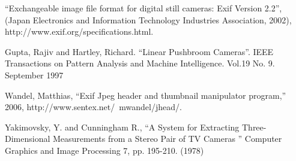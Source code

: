 \begin{thebibliography}{1}

 ``Exchangeable image file format for digital still cameras: Exif Version 2.2'',
(Japan Electronics and Information Technology Industries Association, 2002),
http://www.exif.org/specifications.html.

 Gupta, Rajiv and Hartley, Richard. ``Linear Pushbroom Cameras''.  IEEE
 Transactions on Pattern Analysis and Machine Intelligence. Vol.19 No. 9. September 1997

 Wandel, Matthias, ``Exif Jpeg header and thumbnail manipulator program,'' 2006,
http://www.sentex.net/~mwandel/jhead/.

  Yakimovsky, Y. and Cunningham R., ``A System for Extracting
  Three-Dimensional Measurements from a Stereo Pair of TV Cameras ''
  Computer Graphics and Image Processing 7, pp. 195-210. (1978)

\end{thebibliography}
